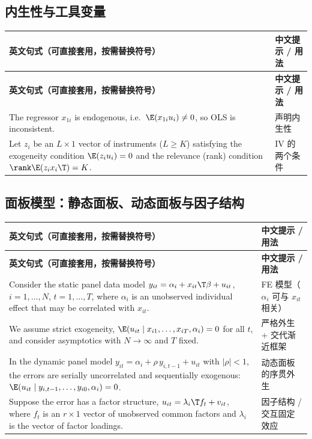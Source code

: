\subsection{内生性与工具变量}

{\renewcommand{\arraystretch}{1.15}\begin{longtable}{@{}>{\raggedright\arraybackslash}p{11.4cm}>{\raggedright\arraybackslash\small}p{4.3cm}@{}}
\toprule
\textbf{英文句式（可直接套用，按需替换符号）} & \textbf{中文提示 / 用法}\\
\midrule
\endfirsthead
\toprule
\textbf{英文句式（可直接套用，按需替换符号）} & \textbf{中文提示 / 用法}\\
\midrule
\endhead
\bottomrule
\endlastfoot
The regressor $x_{1i}$ is endogenous, i.e.\ $\E(x_{1i}u_i)\neq 0$, so OLS is inconsistent. & 声明内生性\\
\addlinespace[2pt]
Let $z_i$ be an $L\times 1$ vector of instruments ($L\ge K$) satisfying the exogeneity condition $\E(z_iu_i)=0$ and the relevance (rank) condition $\rank\E(z_ix_i\T)=K$. & IV 的两个条件\\
\end{longtable}}


\subsection{面板模型：静态面板、动态面板与因子结构}

{\renewcommand{\arraystretch}{1.15}\begin{longtable}{@{}>{\raggedright\arraybackslash}p{11.4cm}>{\raggedright\arraybackslash\small}p{4.3cm}@{}}
\toprule
\textbf{英文句式（可直接套用，按需替换符号）} & \textbf{中文提示 / 用法}\\
\midrule
\endfirsthead
\toprule
\textbf{英文句式（可直接套用，按需替换符号）} & \textbf{中文提示 / 用法}\\
\midrule
\endhead
\bottomrule
\endlastfoot
Consider the static panel data model $y_{it}=\alpha_i+x_{it}\T\beta+u_{it}$, $i=1,\dots,N$, $t=1,\dots,T$, where $\alpha_i$ is an unobserved individual effect that may be correlated with $x_{it}$. & FE 模型（$\alpha_i$ 可与 $x_{it}$ 相关）\\
\addlinespace[2pt]
We assume strict exogeneity, $\E(u_{it}\mid x_{i1},\dots,x_{iT},\alpha_i)=0$ for all $t$, and consider asymptotics with $N\to\infty$ and $T$ fixed. & 严格外生 + 交代渐近框架\\
\addlinespace[2pt]
In the dynamic panel model $y_{it}=\alpha_i+\rho\,y_{i,t-1}+u_{it}$ with $|\rho|<1$, the errors are serially uncorrelated and sequentially exogenous: $\E(u_{it}\mid y_{i,t-1},\dots,y_{i0},\alpha_i)=0$. & 动态面板的序贯外生\\
\addlinespace[2pt]
Suppose the error has a factor structure, $u_{it}=\lambda_i\T f_t+v_{it}$, where $f_t$ is an $r\times 1$ vector of unobserved common factors and $\lambda_i$ is the vector of factor loadings. & 因子结构 / 交互固定效应\\
\end{longtable}}


